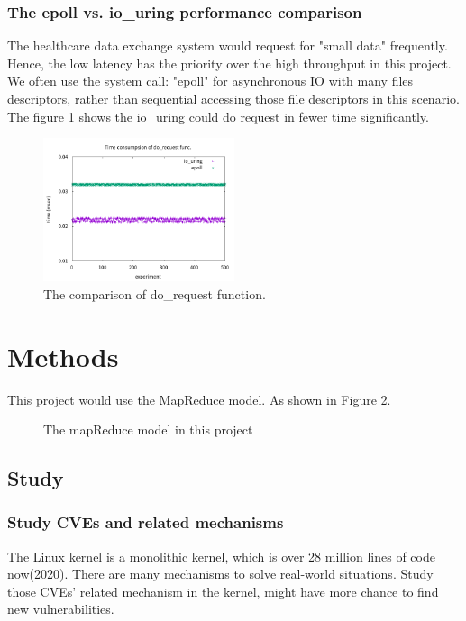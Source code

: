\documentclass[12pt,a4paper]{IEEEconf}
\begin{document}
\subsubsection{The epoll vs. io\_uring performance comparison}
The healthcare data exchange system would request for "small data" frequently.
Hence, the low latency has the priority over the high throughput in this project.
We often use the system call: "epoll" for asynchronous IO with many files
descriptors, rather than sequential accessing those file descriptors in this scenario.
The figure \ref*{fig:iouring} \cite{epoll_vs_iouring} shows the io\_uring could do request in fewer time
significantly.
\begin{figure}
  \includegraphics[width=0.5\textwidth]{io_uring.png}
  \caption{The comparison of do\_request function.}
  \label{fig:iouring}
\end{figure}


\section{Methods}
This project would use the MapReduce model. As shown in Figure \ref*{Fig:model}.

\begin{figure}
  \centering
  \caption[]{The mapReduce model in this project}
  \label{Fig:model}
\end{figure}

\subsection{Study}
\subsubsection{Study CVEs and related mechanisms}
The Linux kernel is a monolithic kernel, which is over 28 million lines of code now(2020). There
are many mechanisms to solve real-world situations. Study those CVEs' related mechanism in the
kernel, might have more chance to find new vulnerabilities.
\end{document}
